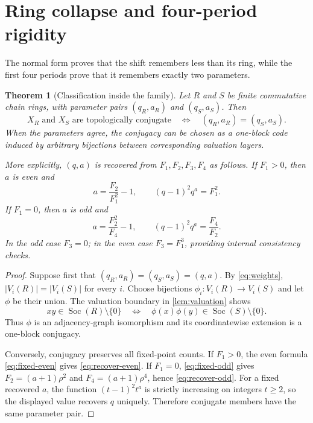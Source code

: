 \documentclass[11pt,a4paper]{amsart}
\newtheorem{theorem}{Theorem}[section]
\theoremstyle{definition}
\theoremstyle{remark}
\newcommand{\Soc}{\operatorname{Soc}}
\begin{document}
\section{Ring collapse and four-period rigidity}
\label{sec:rigidity}

The normal form proves that the shift remembers less than its ring, while
the first four periods prove that it remembers exactly two parameters.

\begin{theorem}[Classification inside the family]
\label{thm:rigidity}
Let $R$ and $S$ be finite commutative chain rings, with parameter pairs
$(q_R,a_R)$ and $(q_S,a_S)$.  Then
\[
 X_R\text{ and }X_S\text{ are topologically conjugate}
 \quad\Longleftrightarrow\quad
 (q_R,a_R)=(q_S,a_S).
\]
When the parameters agree, the conjugacy can be chosen as a one-block code
induced by arbitrary bijections between corresponding valuation layers.

More explicitly, $(q,a)$ is recovered from $F_1,F_2,F_3,F_4$ as follows.
If $F_1>0$, then $a$ is even and
\begin{equation}\label{eq:recover-even}
 a=\frac{F_2}{F_1^2}-1,
 \qquad
 (q-1)^2q^a=F_1^2.
\end{equation}
If $F_1=0$, then $a$ is odd and
\begin{equation}\label{eq:recover-odd}
 a=\frac{F_2^2}{F_4}-1,
 \qquad
 (q-1)^2q^a=\frac{F_4}{F_2}.
\end{equation}
In the odd case $F_3=0$; in the even case $F_3=F_1^3$, providing internal
consistency checks.
\end{theorem}

\begin{proof}
Suppose first that $(q_R,a_R)=(q_S,a_S)=(q,a)$.  By
\eqref{eq:weights}, $|V_i(R)|=|V_i(S)|$ for every $i$.  Choose bijections
$\phi_i:V_i(R)\to V_i(S)$ and let $\phi$ be their union.  The valuation
boundary in \cref{lem:valuation} shows
\[
 xy\in\Soc(R)\setminus\{0\}
 \quad\Longleftrightarrow\quad
 \phi(x)\phi(y)\in\Soc(S)\setminus\{0\}.
\]
Thus $\phi$ is an adjacency-graph isomorphism and its coordinatewise
extension is a one-block conjugacy.

Conversely, conjugacy preserves all fixed-point counts.  If $F_1>0$, the
even formula \eqref{eq:fixed-even} gives \eqref{eq:recover-even}.  If
$F_1=0$, \eqref{eq:fixed-odd} gives
$F_2=(a+1)\rho^2$ and $F_4=(a+1)\rho^4$, hence
\eqref{eq:recover-odd}.  For a fixed recovered $a$, the function
$(t-1)^2t^a$ is strictly increasing on integers $t\geq2$, so the displayed
value recovers $q$ uniquely.  Therefore conjugate members have the same
parameter pair.
\end{proof}
\end{document}

